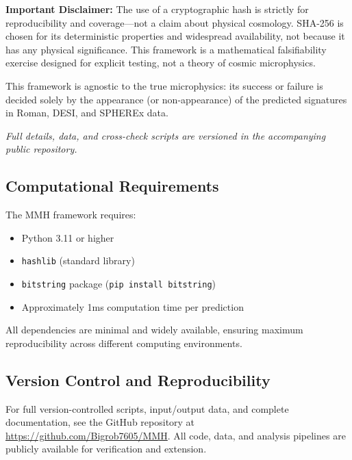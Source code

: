 \textbf{Important Disclaimer:} The use of a cryptographic hash is strictly for reproducibility and coverage—not a claim about physical cosmology. SHA-256 is chosen for its deterministic properties and widespread availability, not because it has any physical significance. This framework is a mathematical falsifiability exercise designed for explicit testing, not a theory of cosmic microphysics.

This framework is agnostic to the true microphysics: its success or failure is decided solely by the appearance (or non-appearance) of the predicted signatures in Roman, DESI, and SPHEREx data.

\textit{Full details, data, and cross-check scripts are versioned in the accompanying public repository.}

\subsection{Computational Requirements}
The MMH framework requires:
\begin{itemize}
  \item Python 3.11 or higher
  \item \texttt{hashlib} (standard library)
  \item \texttt{bitstring} package (\texttt{pip install bitstring})
  \item Approximately 1ms computation time per prediction
\end{itemize}

All dependencies are minimal and widely available, ensuring maximum reproducibility across different computing environments.

\subsection{Version Control and Reproducibility}
For full version-controlled scripts, input/output data, and complete documentation, see the GitHub repository at \url{https://github.com/Bigrob7605/MMH}. All code, data, and analysis pipelines are publicly available for verification and extension.